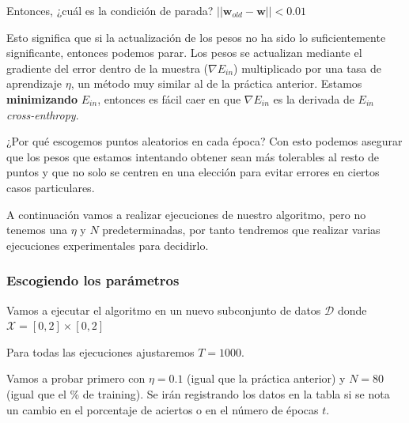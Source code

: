 \documentclass{article}
\begin{document}
    Entonces, ¿cuál es la condición de parada? $||\textbf{w}_{old} - \textbf{w} || < 0.01$

    Esto significa que si la actualización de los pesos no ha sido lo suficientemente
    significante, entonces podemos parar.
    Los pesos se actualizan mediante el gradiente del error dentro de la muestra ($\nabla E_{in}$)
    multiplicado por una tasa de aprendizaje $\eta$, un método muy similar al de la práctica anterior.
    Estamos \textbf{minimizando} $E_{in}$, entonces es fácil caer en que $\nabla E_{in}$ es la derivada
    de $E_{in}$ \emph{cross-enthropy}.
    \linebreak

    ¿Por qué escogemos puntos aleatorios en cada época? Con esto podemos asegurar que
    los pesos que estamos intentando obtener sean más tolerables al resto de puntos y que no
    solo se centren en una elección para evitar errores en ciertos casos particulares.

    A continuación vamos a realizar ejecuciones de nuestro algoritmo, pero no tenemos una $\eta$
    y $N$ predeterminadas, por tanto tendremos que realizar varias ejecuciones experimentales para 
    decidirlo.

    \pagebreak

    \subsubsection{Escogiendo los parámetros}

    Vamos a ejecutar el algoritmo en un nuevo subconjunto de datos $\mathcal{D}$ donde $\mathcal{X} = [0,2] \times [0,2]$

    Para todas las ejecuciones ajustaremos $T = 1000$.

    Vamos a probar primero con $\eta = 0.1$ (igual que la práctica anterior)
    y $N = 80$ (igual que el \% de training). Se irán registrando los datos en la tabla
    si se nota un cambio en el porcentaje de aciertos o en el número de épocas $t$.
\end{document}
